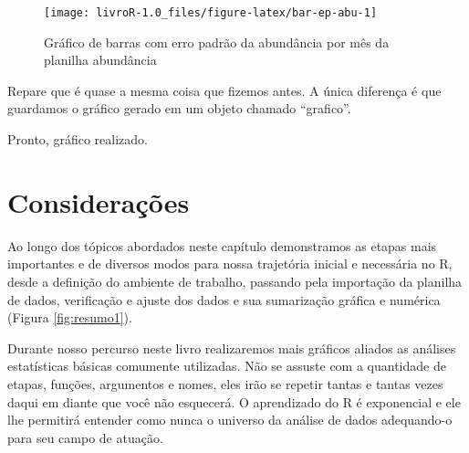 \documentclass[14pt,titlepage, oneside, openany, a4paper]{book}
\newenvironment{Shaded}{\begin{snugshade}}{\end{snugshade}}
\newcommand{\DataTypeTok}[1]{\textcolor[rgb]{0.13,0.29,0.53}{#1}}
\newcommand{\DecValTok}[1]{\textcolor[rgb]{0.00,0.00,0.81}{#1}}
\newcommand{\KeywordTok}[1]{\textcolor[rgb]{0.13,0.29,0.53}{\textbf{#1}}}
\newcommand{\NormalTok}[1]{#1}
\newcommand{\OperatorTok}[1]{\textcolor[rgb]{0.81,0.36,0.00}{\textbf{#1}}}
\newcommand{\StringTok}[1]{\textcolor[rgb]{0.31,0.60,0.02}{#1}}
\begin{document}
\begin{Shaded}
\end{Shaded}

\begin{figure}[H]
\texttt{[image: livroR-1.0\_files/figure-latex/bar-ep-abu-1]} \caption{Gráfico de barras com erro padrão da abundância por mês da planilha abundância}\label{fig:bar-ep-abu}
\end{figure}

Repare que é quase a mesma coisa que fizemos antes. A única diferença é que guardamos o gráfico gerado em um objeto chamado ``grafico''.

Pronto, gráfico realizado.

\hypertarget{considerauxe7uxf5es}{%
\section{Considerações}\label{considerauxe7uxf5es}}

Ao longo dos tópicos abordados neste capítulo demonstramos as etapas mais importantes e de diversos modos para nossa trajetória inicial e necessária no R, desde a definição do ambiente de trabalho, passando pela importação da planilha de dados, verificação e ajuste dos dados e sua sumarização gráfica e numérica (Figura \ref{fig:resumo1}).

Durante nosso percurso neste livro realizaremos mais gráficos aliados as análises estatísticas básicas comumente utilizadas. Não se assuste com a quantidade de etapas, funções, argumentos e nomes, eles irão se repetir tantas e tantas vezes daqui em diante que você não esquecerá. O aprendizado do R é exponencial e ele lhe permitirá entender como nunca o universo da análise de dados adequando-o para seu campo de atuação.
\end{document}
